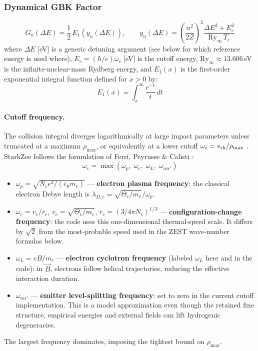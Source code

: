 \documentclass[11pt,a4paper]{article}
\numberwithin{equation}{section}
\begin{document}
\subsubsection{Dynamical GBK Factor}
\begin{equation}
G_n(\Delta E) = \frac{1}{2}\,E_1\!\left(y_n(\Delta E)\right),
\qquad
y_n(\Delta E) =\left(\frac{n^2}{2Z}\right)^{\!2}
              \frac{\Delta E^2 + E_c^2}{\mathrm{Ry}_\infty\,T_e}
\end{equation}
where $\Delta E$ [eV] is a generic detuning argument (see below for which reference energy is used where), $E_c = (\hbar/e)\omega_c$ [eV] is the cutoff energy, $\mathrm{Ry}_\infty \approx 13.606$\,eV is the infinite-nuclear-mass Rydberg energy, and $E_1(x)$ is the first-order exponential integral function defined for $x > 0$ by:
\begin{equation}
E_1(x) = \int_x^\infty \frac{e^{-t}}{t}\, dt
\end{equation}

\paragraph{Cutoff frequency.}
The collision integral diverges logarithmically at large impact parameters unless truncated at a maximum $\rho_{\max}$, or equivalently at a lower cutoff $\omega_c = v_{\rm th}/\rho_{\max}$ \cite{griem1959}. StarkZee follows the formulation of Ferri, Peyrusse \& Calisti \cite{ferri}:
\begin{equation}
\omega_c = \max\!\left(\omega_p,\;\omega_e,\;\omega_L,\;\omega_{\alpha\alpha'}\right)
\end{equation}
\begin{itemize}
    \item $\omega_p = \sqrt{N_e e^2/(\varepsilon_0 m_e)}$ — \textbf{electron plasma frequency}: the classical electron Debye length is $\lambda_{D,e}=\sqrt{\Theta_e/m_e}/\omega_p$.
    \item $\omega_e = v_e/r_e$, $v_e=\sqrt{\Theta_e/m_e}$, $r_e=(3/4\pi N_e)^{1/3}$ — \textbf{configuration-change frequency}: the code uses this one-dimensional thermal-speed scale. It differs by $\sqrt{2}$ from the most-probable speed used in the ZEST wave-number formulas below.
    \item $\omega_L = eB/m_e$ — \textbf{electron cyclotron frequency} (labeled $\omega_L$ here and in the code): in $\vec{B}$, electrons follow helical trajectories, reducing the effective interaction duration.
    \item $\omega_{\alpha\alpha'}$ — \textbf{emitter level-splitting frequency}: set to zero in the current cutoff implementation. This is a model approximation even though the retained fine structure, empirical energies and external fields can lift hydrogenic degeneracies.
\end{itemize}
The largest frequency dominates, imposing the tightest bound on $\rho_{\max}$.
\end{document}
